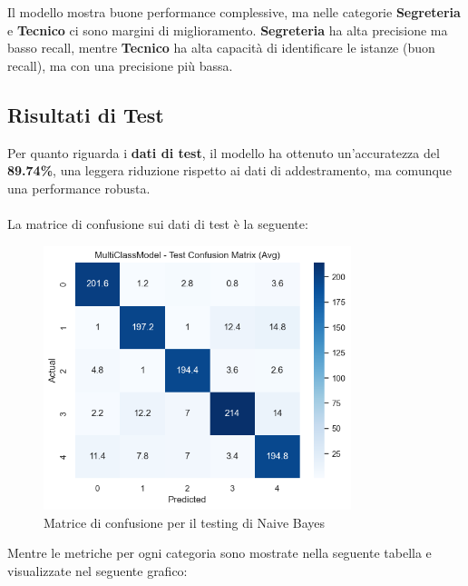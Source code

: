 Il modello mostra buone performance complessive, ma nelle categorie \textbf{Segreteria} e \textbf{Tecnico} ci sono margini di miglioramento. \textbf{Segreteria} ha alta precisione ma basso recall, mentre \textbf{Tecnico} ha alta capacità di identificare le istanze (buon recall), ma con una precisione più bassa.

\newpage

\subsection{Risultati di Test}

Per quanto riguarda i \textbf{dati di test}, il modello ha ottenuto un'accuratezza del \textbf{89.74\%}, una leggera riduzione rispetto ai dati di addestramento, ma comunque una performance robusta. \\ \\
La matrice di confusione sui dati di test è la seguente:

\begin{figure}[H]
    \centering
    \includegraphics[width=0.8\textwidth]{images/confusion_matrix_test_naive_bayes.png}
    \caption{Matrice di confusione per il testing di Naive Bayes}
    \label{fig:confusion_matrix_test_naive_bayes}
\end{figure}

Mentre le metriche per ogni categoria sono mostrate nella seguente tabella e visualizzate nel seguente grafico:

